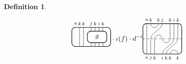 \documentclass[11pt]{article}
\theoremstyle{plain}
\theoremstyle{definition}
\newtheorem{defn}[thm]{Definition}
\newcommand{\TLPlusPIso}[3]{
 \TLTStart
 \TLTThrough{#1}
 \TLTSnakeR{#2}{#3}
 \TLTEnd
}
\newcommand{\TLTCalcLabelOffset}[3][0cm]{
 \settowidth{#2}{\scriptsize{$#3$}}
 \setlength{#2}{.5#2}
 \setlength{#2}{\maxof{#2}{#1}}
}
\newcommand{\TLTEnd}{
 \draw[thick, rounded corners = 5pt] (0,0) rectangle ($ (TLTlead) + (0,.8) $);
 \end{tikzpicture}
}
\newcommand{\TLTStart}{
 \begin{tikzpicture}[baseline=.3cm]
 \coordinate (TLTlead) at (.2,0); %
 \let\TLTlabelwidth\relax
 \newlength{\TLTlabelwidth}
}
\newcommand{\TLTThrough}[1]{
 \TLTCalcLabelOffset[.2cm]{\TLTlabelwidth}{#1}
 \coordinate (TLTlead) at ($ (TLTlead) + ({\TLTlabelwidth},0) $);
 \begin{scope}[shift=(TLTlead)]
  \draw (0,0) -- (0,.8);
  \node at (0,1) {\scriptsize{$#1$}};
 \end{scope}
  \coordinate (TLTlead) at ($ (TLTlead) + ({\TLTlabelwidth},0) $);
}
\newcommand{\TLTSnakeR}[2]{
 \let\TLTscwidth\relax
 \newlength{\TLTscwidth}
 \let\TLTsswidth\relax
 \newlength{\TLTsswidth}
 \TLTCalcLabelOffset[.2cm]{\TLTscwidth}{#1}
 \TLTCalcLabelOffset[.5cm]{\TLTsswidth}{#2}
 \setlength{\TLTlabelwidth}{\TLTscwidth+\TLTsswidth}
 \setlength{\TLTlabelwidth}{\maxof{\TLTlabelwidth}{.7cm}} %
 \coordinate (TLTlead) at ($ (TLTlead) + ({\TLTscwidth},0) $);
 \begin{scope}[shift=(TLTlead)]
  \draw (.1,.8) arc (-180:0:.2cm);
  \draw (.1,0) .. controls ++(90:.3cm) and ++(270:.3cm) .. ($ (.1,.8) + ({\TLTlabelwidth},0) $);
  \draw ($ (.1,0) + ({\TLTsswidth},0) $) arc (180:0:.2cm);
  \node at (.1,1) {\scriptsize{$#1$}};
  \node at ($ (.1,1) + ({\TLTlabelwidth},0) $) {\scriptsize{$#2$}};
  \node at ($ (.1,-.2) + ({\TLTsswidth},0) $) {\scriptsize{$#1$}};
 \end{scope}
 \coordinate (TLTlead) at ($ (TLTlead) + ({\TLTlabelwidth+\TLTsswidth},0) $);
}
\begin{document}
\begin{defn}
\begin{align*}
\begin{tikzpicture}[baseline=.3cm]
   \node at (.2,1.2) {\scriptsize{$n$}};
   \draw (.4,0) -- (.4,1);
   \node at (.4,1.2) {\scriptsize{$k$}};
   \draw (.6,0) -- (.6,1);
   \node at (.6,1.2) {\scriptsize{$k$}};
   \draw (1,0) -- (1,1);
   \node at (1,1.2) {\scriptsize{$j$}};
   \draw (1.2,0) -- (1.2,1);
   \node at (1.2,1.2) {\scriptsize{$k$}};
   \draw (1.4,0) -- (1.4,1);
   \node at (1.4,1.2) {\scriptsize{$i$}};
   \draw (1.6,0) -- (1.6,1);
   \node at (1.6,1.2) {\scriptsize{$k$}};
   \draw[thick, rounded corners = 5pt, fill=white] (.8,.2) rectangle (1.8,.8);
   \node at (1.3,.5) {$g$};
   \draw[thick,rounded corners = 5pt] (0,0) rectangle (2,1);
  \end{tikzpicture}
  \cdot\iota(f)\cdot
d^{-i}
  \begin{tikzpicture}[baseline=-0.1cm]
   \begin{scope}[shift={(.1,0)}]
    \draw (.1,0) -- (.1,.8);
    \node at (.1,1) {\scriptsize{$n$}};
    \draw (.3,.8) arc (-180:0:.2cm);
    \node at (.3,1) {\scriptsize{$k$}};
    \node at (.7,1) {\scriptsize{$k$}};
    \draw (.3,0) .. controls ++(90:.3cm) and ++(270:.3cm) .. (.9,.8);
    \node at (.9,1) {\scriptsize{$j$}};
    \draw (.5,0) arc (180:0:.2cm); %
    \draw (1.3,0) -- (1.3,.8);
    \node at (1.3,1) {\scriptsize{$k$}};
    \draw (1.5,0) -- (1.5,.8);
    \node at (1.5,1) {\scriptsize{$i$}};
    \draw (1.7,0) -- (1.7,.8);
    \node at (1.7,1) {\scriptsize{$k$}};
   \end{scope}
   \draw[dashed] (0,0) -- (2,0);
   \begin{scope}[shift={(.1,-0.8)}]
    \draw (.1,0) -- (.1,.8);
    \node at (.1,-0.2) {\scriptsize{$n$}};
    \draw (.3,0) -- (.3,.8);
    \node at (.3,-0.2) {\scriptsize{$j$}};
    \draw (.5,0) -- (.5,.8);
    \node at (.5,-0.2) {\scriptsize{$k$}};
    \draw (.9,.8) arc (-180:0:.2cm); %
    \draw (.9,0) .. controls ++(90:.3cm) and ++(270:.3cm) .. (1.5,.8);
    \node at (0.9,-0.2) {\scriptsize{$i$}};
    \draw (1.1,0) .. controls ++(90:.3cm) and ++(270:.3cm) .. (1.7,.8);
    \node at (1.1,-0.2) {\scriptsize{$k$}};
    \draw (1.3,0) arc (180:0:.2cm);
    \node at (1.3,-.2) {\scriptsize{$k$}};
    \node at (1.7,-.2) {\scriptsize{$k$}};
   \end{scope}
   \draw[thick, rounded corners = 5pt] (0,-0.8) rectangle (2,0.8);

\end{tikzpicture}
\end{align*}
\end{defn}
\end{document}
